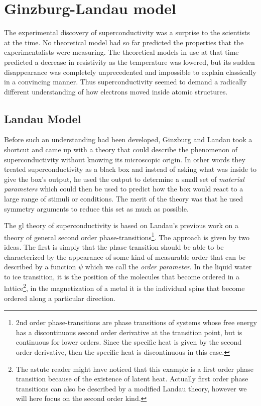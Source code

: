\section{Ginzburg-Landau model}

The experimental discovery of superconductivity was a surprise to the scientists at the time. No theoretical model
had so far predicted the properties that the experimentalists were measuring. The theoretical models in use at that
time predicted a decrease in resistivity as the temperature was lowered, but its sudden disappearance was completely
unprecedented and impossible to explain classically in a convincing manner. Thus superconductivity seemed to demand
a radically different understanding of how electrons moved inside atomic structures.

\subsection{Landau Model}

Before such an understanding had been developed, Ginzburg and Landau took a shortcut and came up with a theory
that could describe the phenomenon of superconductivity without knowing its microscopic origin. In other words
they treated superconductivity as a black box and instead of asking what was inside to give the box's output,
he used the output to determine a small set of \emph{material parameters} which could then be used to predict
how the box would react to a large range of stimuli or conditions. The merit of the theory was that
he used symmetry arguments to reduce this set as much as possible.

The \ac{gl} theory of superconductivity is based on Landau's previous work on a theory of general second
order phase-transitions\footnote{2nd order phase-transitions are phase transitions of systems whose free energy
has a discontinuous second order derivative at the transition point, but is continuous for lower orders.
Since the specific heat is given by the second order derivative, then the specific heat is discontinuous in this case.}.
The approach is given by two ideas. The first is simply that the phase transition should be able to be characterized
by the appearance of some kind of measurable
order that can be described by a function $\psi$ which we call the \emph{order parameter}. In the liquid water to ice transition,
it is the position of the molecules that become ordered in a lattice\footnote{The astute reader might have noticed that this
example is a first order phase transition because of the existence of latent heat. Actually first order phase transitions
can also be described by a modified Landau theory, however we will here focus on the second order kind.},
in the magnetization of a metal it is the individual spins that become ordered along a particular direction.

